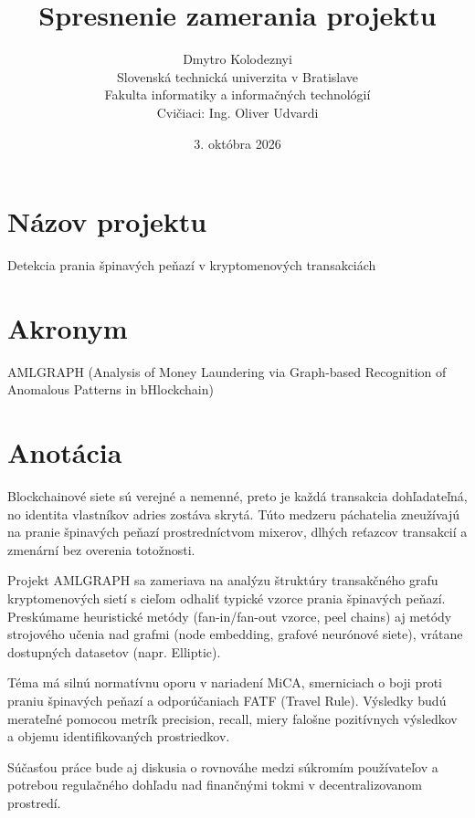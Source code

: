 \documentclass[11pt,a4paper]{article}
\title{Spresnenie zamerania projektu}
\author{
Dmytro Kolodeznyi \\
[2pt]
{\small Slovenská technická univerzita v Bratislave} \\
{\small Fakulta informatiky a informačných technológií} \\[4pt]
{\small Cvičiaci: Ing. Oliver Udvardi}
}
\date{3. októbra 2026}
\begin{document}
\maketitle
 
\section*{Názov projektu}
Detekcia prania špinavých peňazí v kryptomenových transakciách
 
\section*{Akronym}
AMLGRAPH (Analysis of Money Laundering via Graph-based Recognition of Anomalous Patterns in bHlockchain)
 
\section*{Anotácia}
Blockchainové siete sú verejné a nemenné, preto je každá transakcia dohľadateľná, no identita vlastníkov adries zostáva skrytá. Túto medzeru páchatelia zneužívajú na pranie špinavých peňazí prostredníctvom mixerov, dlhých reťazcov transakcií a zmenární bez overenia totožnosti.
 
Projekt AMLGRAPH sa zameriava na analýzu štruktúry transakčného grafu kryptomenových sietí s cieľom odhaliť typické vzorce prania špinavých peňazí. Preskúmame heuristické metódy (fan-in/fan-out vzorce, peel chains) aj metódy strojového učenia nad grafmi (node embedding, grafové neurónové siete), vrátane dostupných datasetov (napr. Elliptic).
 
Téma má silnú normatívnu oporu v nariadení MiCA, smerniciach o boji proti praniu špinavých peňazí a odporúčaniach FATF (Travel Rule). Výsledky budú merateľné pomocou metrík precision, recall, miery falošne pozitívnych výsledkov a objemu identifikovaných prostriedkov.
 
Súčasťou práce bude aj diskusia o rovnováhe medzi súkromím používateľov a potrebou regulačného dohľadu nad finančnými tokmi v decentralizovanom prostredí.
 
\end{document}
